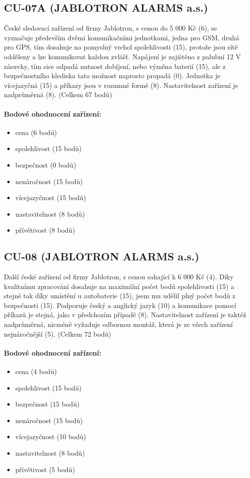 \documentclass[FM,BP]{tulthesis}  %
\begin{document}
\subsection{CU-07A (JABLOTRON ALARMS a.s.)}
České sledovací zařízení od firmy Jablotron, s cenou do 5 000 Kč (6), se vyznačuje především dvěmi komunikačními jednotkami, jedna pro GSM, druhá pro GPS, tím dosahuje na pomyslný vrchol spolehlivosti (15), protože jsou sítě odděleny a lze komunikovat každou zvlášť. Napájení je zajištěno z palubní 12 V zásuvky, tím sice odpadá nutnost dobíjení, nebo výměna baterií (15), ale z bezpečnostního hlediska tato možnost naprosto propadá (0). Jednotka je vícejazyčná (15) a příkazy jsou v rozumné formě (8). Nastavitelnost zařízení je nadprůměrná (8). (Celkem 67 bodů)

\paragraph{Bodové ohodnocení zařízení:}
\begin{itemize}
\item cena (6 bodů)
\item spolehlivost (15 bodů)
\item bezpečnost (0 bodů)
\item nenáročnost (15 bodů)
\item vícejazyčnost (15 bodů)
\item nastavitelnost (8 bodů)
\item přívětivost (8 bodů)
\end{itemize}

\subsection{CU-08 (JABLOTRON ALARMS a.s.)}
Další české zařízení od firmy Jablotron, s cenou sahající k 6 000 Kč (4). Diky kvalitnímu zpracování dosahuje na maximální počet bodů spolehlivosti (15) a stejně tak díky umístění u autobaterie (15), jsem mu udělil plný počet bodů z bezpečnosti (15). Podporuje český a anglický jazyk (10) a komunikace pomocí příkazů je stejná, jako v předchozím případě (8). Nastavitelnost zařízení je taktéž nadprůměrná, nicméně vyžaduje odbornou montáž, která je ze všech zařízení nejnáročnější (5). (Celkem 72 bodů)

\paragraph{Bodové ohodnocení zařízení:}
\begin{itemize}
\item cena (4 bodů)
\item spolehlivost (15 bodů)
\item bezpečnost (15 bodů)
\item nenáročnost (15 bodů)
\item vícejazyčnost (10 bodů)
\item nastavitelnost (8 bodů)
\item přívětivost (5 bodů)
\end{itemize}
\end{document}
